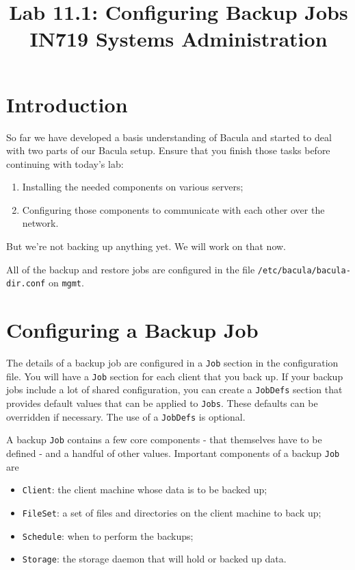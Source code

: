 \documentclass{article}   	%
\title{Lab 11.1:  Configuring Backup Jobs\\ IN719 Systems Administration}
\date{}							%
\begin{document}
\maketitle

\section*{Introduction}
So far we have developed a basis understanding of Bacula and started to deal with two parts of our Bacula setup. Ensure that you finish those tasks before continuing with today's lab:
\begin{enumerate}
	\item Installing the needed components on various servers;
	\item Configuring those components to communicate with each other over the network.
\end{enumerate}

But we're not backing up anything yet.  We will work on that now.

All of the backup and restore jobs are configured in the file \texttt{/etc/bacula/bacula-dir.conf} on \texttt{mgmt}.

\section{Configuring a Backup Job}
The details of a backup job are configured in a \texttt{Job} section in the configuration file.  You will have a \texttt{Job} section for each client that you back up.  If your backup jobs include a lot of shared configuration, you can create a \texttt{JobDefs} section that provides default values that can be applied to \texttt{Jobs}.  These defaults can be overridden if necessary.  The use of a \texttt{JobDefs} is optional.

A backup \texttt{Job} contains a few core components - that themselves have to be defined - and a handful of other values.  Important components of a backup \texttt{Job} are

\begin{itemize}
	\item \texttt{Client}: the client machine whose data is to be backed up;
	\item \texttt{FileSet}: a set of files and directories on the client machine to back up;
	\item \texttt{Schedule}: when to perform the backups;
	\item \texttt{Storage}: the storage daemon that will hold or backed up data.
\end{itemize}
\end{document}
